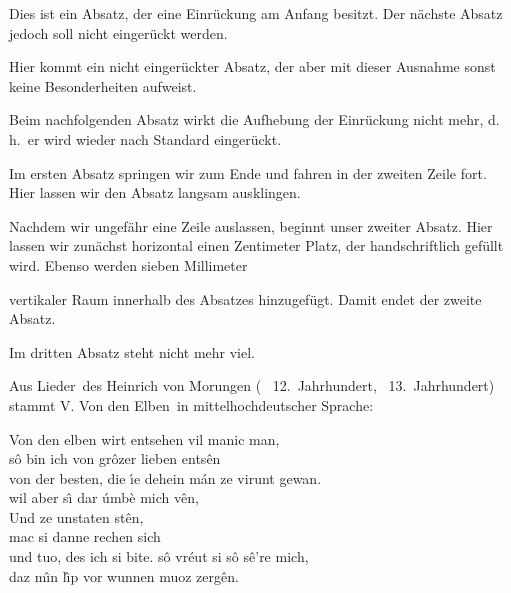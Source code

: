 \documentclass[a4paper, 12pt]{article} %
\begin{document}
\hspace{\fill} Dies ist ein Absatz, der eine Einrückung am Anfang besitzt.
Der nächste Absatz jedoch soll nicht eingerückt werden.\par
Hier kommt ein nicht eingerückter Absatz, der aber mit
dieser Ausnahme sonst keine Besonderheiten aufweist.\par
\vfill
Beim nachfolgenden Absatz wirkt die Aufhebung der
Einrückung nicht mehr, d.\,h.\ er wird wieder nach
Standard eingerückt.\par

Im ersten Absatz springen wir \hfill zum Ende \linebreak
und fahren in der zweiten Zeile fort. Hier lassen wir den Absatz langsam 
ausklingen.\par\bigskip

Nachdem wir ungefähr eine Zeile auslassen, beginnt unser zweiter Absatz. Hier
lassen wir zunächst horizontal einen Zentimeter \hspace*{1cm} Platz, der
handschriftlich gefüllt wird. Ebenso werden sieben Millimeter\vspace{7mm}

vertikaler Raum innerhalb des Absatzes hinzugefügt. Damit endet der
zweite Absatz.\par

Im dritten Absatz steht nicht mehr viel.\par\bigskip


Aus \flqq Lieder\frqq\ des Heinrich von Morungen (\textasteriskcentered 
~12.~Jahrhundert, \textdagger ~13.~Jahrhundert) stammt \flqq V. Von den Elben\frqq\
in mittelhochdeutscher Sprache:\par\medskip\noindent
\glqq Von den elben wirt entsehen vil manic man,\\
\hspace*{2ex} s\^{o} bin ich von gr\^{o}zer lieben ents\^{e}n \\
von der besten, die \'{\i}e dehein m\'{a}n ze virunt gewan.\\
\hspace*{2ex} wil aber s\^{\i} dar \'{u}mb\`{e} mich v\^{e}n,\\
\hspace*{2ex} Und ze unstaten st\^{e}n,\\
\hspace*{4ex} mac si danne rechen sich\\
\hspace*{4ex} und tuo, des ich si bite. s\^{o} vr\'{e}ut si
s\^{o} s\^{e}\textquoteright re mich,\\
\hspace*{2ex} daz m\^{\i}n l\^{\i}p vor wunnen muoz zerg\^{e}n.\grqq
\end{document}
